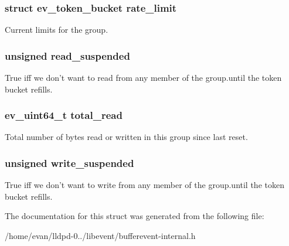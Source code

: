 \subsubsection[{rate\-\_\-limit}]{\setlength{\rightskip}{0pt plus 5cm}struct {\bf ev\-\_\-token\-\_\-bucket} {\bf rate\-\_\-limit}}\label{structbufferevent__rate__limit__group_a24ecd366a043b9d0c297a4d4ca47d6ee}
\-Current limits for the group. 
\subsubsection[{read\-\_\-suspended}]{\setlength{\rightskip}{0pt plus 5cm}unsigned {\bf read\-\_\-suspended}}\label{structbufferevent__rate__limit__group_ab2aa6f5e3f289343beff8ed9c08868f9}
\-True iff we don't want to read from any member of the group.\-until the token bucket refills. 
\subsubsection[{total\-\_\-read}]{\setlength{\rightskip}{0pt plus 5cm}ev\-\_\-uint64\-\_\-t {\bf total\-\_\-read}}\label{structbufferevent__rate__limit__group_a1e0dbde40112bb1504f9d101489ebeab}
\-Total number of bytes read or written in this group since last reset. 
\subsubsection[{write\-\_\-suspended}]{\setlength{\rightskip}{0pt plus 5cm}unsigned {\bf write\-\_\-suspended}}\label{structbufferevent__rate__limit__group_a537b07d29e11938359ca12f1862e92e7}
\-True iff we don't want to write from any member of the group.\-until the token bucket refills. 

\-The documentation for this struct was generated from the following file\-:\begin{DoxyCompactItemize}
\item 
/home/evan/lldpd-\/0../libevent/bufferevent-\/internal.\-h\end{DoxyCompactItemize}
